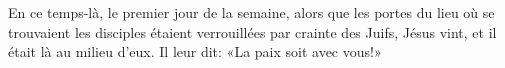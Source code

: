 En ce temps-là, le premier jour de la semaine,
	alors que les portes du lieu où se trouvaient les disciples
		étaient verrouillées par crainte des Juifs,
	Jésus vint, et il était là au milieu d’eux.
Il leur dit: «La paix soit avec vous!»
